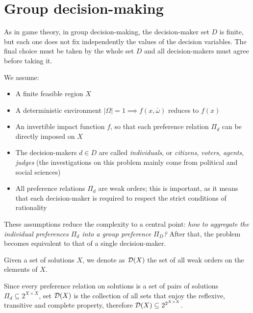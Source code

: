 \chapter{Group decision-making}
\label{ch:gdm}

As in game theory, in group decision-making, the decision-maker set $D$ is finite, but each one does not fix independently the values of the decision variables. The final choice must be taken by the whole set $D$ and all decision-makers must agree before taking it.

We assume: 
\begin{itemize}
	\item A finite feasible region $X$
	
	\item A deterministic environment $|\Omega| = 1 \implies f(x, \bar \omega)$ reduces to $f(x)$
	
	\item An invertible impact function $f$, so that each preference relation $\Pi_d$ can be directly imposed on $X$
	
	\item The decision-makers $d \in D$ are called \textit{individuals}, or \textit{citizens}, \textit{voters}, \textit{agents}, \textit{judges} (the investigations on this problem mainly come from political and social sciences)
	
	\item All preference relations $\Pi_d$ are weak orders; this is important, as it means that each decision-maker is required to respect the strict conditions of rationality
\end{itemize}

These assumptions reduce the complexity to a central point: \textit{how to aggregate the individual preferences $\Pi_d$ into a group preference $\Pi_D$?} After that, the problem becomes equivalent to that of a single decision-maker. \\

\begin{definition}
	Given a set of solutions $X$, we denote as $\operatorname{\mathcal{D}}(X)$ the set of all weak orders on the elements of $X$.
\end{definition}

Since every preference relation on solutions is a set of pairs of solutions $\Pi_d \subseteq 2^{X \times X}$, set $\operatorname{\mathcal{D}}(X)$ is the collection of all sets that enjoy the reflexive, transitive and complete property, therefore $\operatorname{\mathcal{D}}(X) \subseteq 2^{2^{X \times X}}$.

